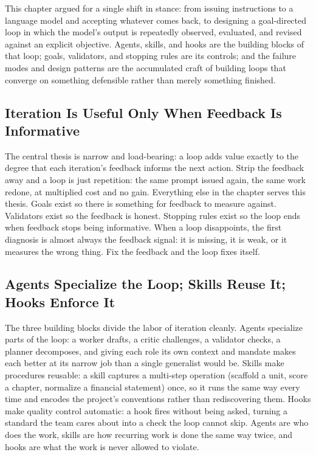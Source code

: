 This chapter argued for a single shift in stance: from issuing instructions to a
language model and accepting whatever comes back, to designing a goal-directed
loop in which the model's output is repeatedly observed, evaluated, and revised
against an explicit objective. Agents, skills, and hooks are the building blocks
of that loop; goals, validators, and stopping rules are its controls; and the
failure modes and design patterns are the accumulated craft of building loops
that converge on something defensible rather than merely something finished.

\subsection{Iteration Is Useful Only When Feedback Is Informative}\label{subsec:takeaway-feedback}

The central thesis is narrow and load-bearing: a loop adds value exactly to the
degree that each iteration's feedback informs the next action. Strip the feedback
away and a loop is just repetition: the same prompt issued again, the same
work redone, at multiplied cost and no gain. Everything else in the chapter
serves this thesis. Goals exist so there is something for feedback to measure
against. Validators exist so the feedback is honest. Stopping rules exist so the
loop ends when feedback stops being informative. When a loop disappoints, the
first diagnosis is almost always the feedback signal: it is missing, it is weak,
or it measures the wrong thing. Fix the feedback and the loop fixes itself.

\subsection{Agents Specialize the Loop; Skills Reuse It; Hooks Enforce It}\label{subsec:takeaway-three-blocks}

The three building blocks divide the labor of iteration cleanly. Agents
specialize parts of the loop: a worker drafts, a critic challenges, a validator
checks, a planner decomposes, and giving each role its own context and mandate
makes each better at its narrow job than a single generalist would be. Skills
make procedures reusable: a skill captures a multi-step operation (scaffold a
unit, score a chapter, normalize a financial statement) once, so it runs the
same way every time and encodes the project's conventions rather than
rediscovering them. Hooks make quality control automatic: a hook fires without
being asked, turning a standard the team cares about into a check the loop cannot
skip. Agents are who does the work, skills are how recurring work is done the same
way twice, and hooks are what the work is never allowed to violate.

